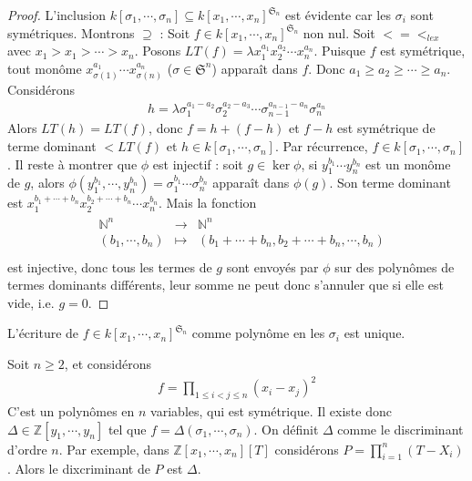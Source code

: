         \begin{proof}
            L'inclusion $k[\sigma_1, \cdots, \sigma_n] \subseteq k[x_1, \cdots, x_n]^{\mathfrak{S}_n}$ est évidente car les $\sigma_i$ sont symétriques. Montrons $\supseteq$ : Soit $f \in k[x_1, \cdots, x_n]^{\mathfrak{S}_n}$ non nul. Soit $< = <_{lex}$ avec $x_1 > x_1 > \cdots > x_n$. Posons $LT(f) = \lambda x_1^{a_1}x_2^{a_2} \cdots x_n^{a_n}$. Puisque $f$ est symétrique, tout monôme $x_{\sigma(1)}^{a_1} \cdots x_{\sigma(n)}^{a_n}$ ($\sigma \in \mathfrak{S}^n$) apparaît dans $f$. Donc $a_1 \geq a_2 \geq \cdots \geq a_n$. Considérons 
            \begin{align*}
                h = \lambda \sigma_1^{a_1 - a_2} \sigma_2^{a_2 - a_3} \cdots \sigma_{n - 1}^{a_{n - 1} - a_n} \sigma_n^{a_n}
            \end{align*}
            Alors $LT(h) = LT(f)$, donc $f = h + (f - h)$ et $f - h$ est symétrique de terme dominant $< LT(f)$ et $h \in k[\sigma_1, \cdots, \sigma_n]$. Par récurrence, $f \in k[\sigma_1, \cdots, \sigma_n]$. Il reste à montrer que $\phi$ est injectif : soit $g \in \ker \phi$, si $y_1^{b_1} \cdots y_n^{b_n}$ est un monôme de $g$, alors $\phi(y_1^{b_1}, \cdots, y_n^{b_n}) = \sigma_1^{b_1} \cdots \sigma_n^{b_n}$ apparaît dans $\phi(g)$. Son terme dominant est $x_1^{b_1 + \cdots + b_n}x_2^{b_2 + \cdots + b_n} \cdots x_n^{b_n}$. Mais la fonction
            \begin{align*}
                \begin{array}{cccc}
                    & \mathbb{N}^n & \to & \mathbb{N}^n \\
                    & (b_1, \cdots, b_n) & \mapsto & (b_1 + \cdots + b_n, b_2 + \cdots + b_n, \cdots, b_n) \\
                \end{array}
            \end{align*}
            est injective, donc tous les termes de $g$ sont envoyés par $\phi$ sur des polynômes de termes dominants différents, leur somme ne peut donc s'annuler que si elle est vide, i.e. $g = 0$.
        \end{proof}
        \begin{coro}
            L'écriture de $f \in k[x_1, \cdots, x_n]^{\mathfrak{S}_n}$ comme polynôme en les $\sigma_i$ est unique.
        \end{coro}
        \begin{expl}
            Soit $n \geq 2$, et considérons
            \begin{align*}
                f = \prod_{1 \leq i < j \leq n} (x_i - x_j)^2
            \end{align*}
            C'est un polynômes en $n$ variables, qui est symétrique. Il existe donc $\Delta \in \mathbb{Z}[y_1, \cdots, y_n]$ tel que $f = \Delta(\sigma_1, \cdots, \sigma_n)$. On définit $\Delta$ comme le discriminant d'ordre $n$. Par exemple, dans $\mathbb{Z}[x_1, \cdots, x_n][T]$ considérons $P = \prod_{i = 1}^n (T - X_i)$. Alors le dixcriminant de $P$ est $\Delta$.
        \end{expl}
